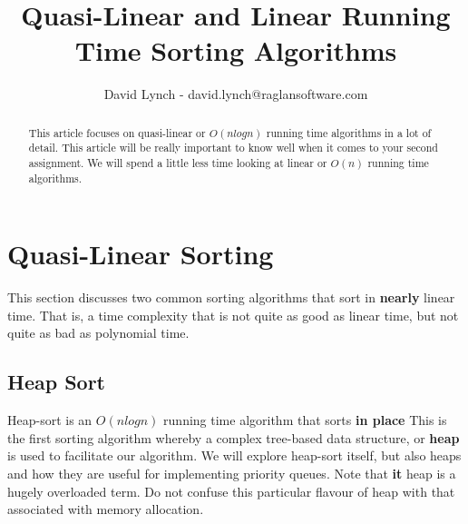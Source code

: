 \documentclass[10pt,a4paper]{article}
\title{Quasi-Linear and Linear Running Time Sorting Algorithms}
\author{David Lynch - david.lynch@raglansoftware.com }
\begin{document}
\maketitle
\begin{abstract}
This article focuses on quasi-linear or $O(n log n)$ running time algorithms in a lot of detail. This article will be really important to know well when it comes to your second assignment. We will spend a little less time looking at linear or $O(n)$ running time algorithms.
\end{abstract}
\section{Quasi-Linear Sorting}
This section discusses two common sorting algorithms that sort in {\bf nearly} linear time. That is, a time complexity that is not quite as good as linear time, but not quite as bad as polynomial time. 
\subsection{Heap Sort}
Heap-sort is an $O(n log n)$ running time algorithm that sorts {\bf in place} This is the first sorting algorithm whereby a complex tree-based data structure, or {\bf heap} is used to facilitate our algorithm. We will explore heap-sort itself, but also heaps and how they are useful for implementing priority queues. Note that {\bf it} heap is a hugely overloaded term. Do not confuse this particular flavour of heap with that associated with memory allocation.   
\end{document}
